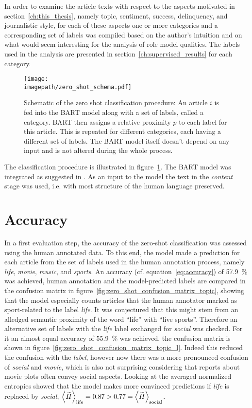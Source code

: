 In order to examine the article texts with respect to the aspects motivated in section~\ref{ch:this_thesis}, namely topic, sentiment, success, delinquency, and journalistic style, for each of these aspects one or more categories and a corresponding set of labels was compiled based on the author's intuition and on what would seem interesting for the analysis of role model qualities. The labels used in the analysis are presented in section~\ref{ch:supervised_results} for each category.

\begin{figure}
    \centering
    \texttt{[image: \\imagepath/zero\_shot\_schema.pdf]}
    \caption{Schematic of the zero shot classification procedure: An article $i$ is fed into the BART model along with a set of labels, called a category. BART then assigns a relative proximity $p$ to each label for this article. This is repeated for different categories, each having a different set of labels. The BART model itself doesn't depend on any input and is not altered during the whole process.}\label{fig:zero_shot_schema}
\end{figure}

The classification procedure is illustrated in figure~\ref{fig:zero_shot_schema}. The BART model was integrated as suggested in \textcite{huggingfacebart-large-mnli_facebookbart-large-mnli_nodate}. As an input to the model the text in the \textit{content} stage was used, i.e. with most structure of the human language preserved.

\section{Accuracy}\label{ch:supervised_accuracy}
In a first evaluation step, the accuracy of the zero-shot classification was assessed using the human annotated data. To this end, the model made a prediction for each article from the set of labels used in the human annotation process, namely \textit{life}, \textit{movie}, \textit{music}, and \textit{sports}. An accuracy (cf. equation~\eqref{eq:accuracy}) of \SI{57.9}{\percent} was achieved, human annotation and the model-predicted labels are compared in the confusion matrix in figure~\ref{fig:zero_shot_confusion_matrix_topic}, showing that the model especially counts articles that the human annotator marked as sport-related to the label \textit{life}. It was conjectured that this might stem from an alledged semantic proximity of the word ``life'' with ``live sports''. Therefore an alternative set of labels with the \textit{life} label exchanged for \textit{social} was checked. For it an almost equal accuracy of \SI{55.9}{\percent} was achieved, the confusion matrix is shown in figure~\ref{fig:zero_shot_confusion_matrix_topic_l}. Indeed this reduced the confusion with the \textit{label}, however now there was a more pronounced confusion of \textit{social} and \textit{movie}, which is also not surprising considering that reports about movie plots often convey social aspects. Looking at the averaged normalized entropies showed that the model makes more convinced predictions if \textit{life} is replaced by \textit{social}, $\Braket{\widetilde{H}}_\text{life} = 0.87 > 0.77 = \Braket{\widetilde{H}}_\text{social}$.

